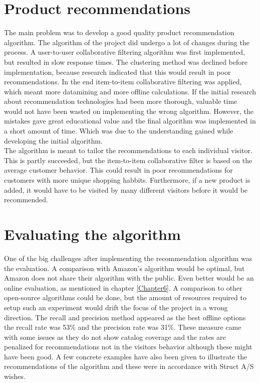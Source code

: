 \section{Product recommendations}
The main problem was to develop a good quality product recommendation algorithm. The algorithm of the project did undergo a lot of changes during the process. A user-to-user collaborative filtering algorithm was first implemented, but resulted in slow response times. The clustering method was declined before implementation, because research indicated that this would result in poor recommendations. \cite{AmazonRecommendations} In the end item-to-item collaborative filtering was applied, which meant more datamining and more offline calculations. If the initial research about recommendation technologies had been more thorough, valuable time would not have been wasted on implementing the wrong algorithm. However, the mistakes gave great educational value and the final algorithm was implemented in a short amount of time. Which was due to the understanding gained while developing the initial algorithm.\\
The algorithm is meant to tailor the recommendations to each individual visitor. This is partly succeeded, but the item-to-item collaborative filter is based on the average customer behavior. This could result in poor recommendations for customers with more unique shopping habbits. Furthermore, if a new product is added, it would have to be visited by many different visitors before it would be recommended.

\section{Evaluating the algorithm}
One of the big challenges after implementing the recommendation algorithm was the evaluation. A comparison with Amazon's algorithm would be optimal, but Amazon does not share their algorithm with the public. Even better would be an online evaluation, as mentioned in chapter \ref{Chapter6}. A comparison to other open-source algorithms could be done, but the amount of resources required to setup such an experiment would drift the focus of the project in a wrong direction. The recall and precision method appeared as the best offline options the recall rate was 53\% and the precision rate was 31\%. These measure came with some issues as they do not show catalog coverage and the rates are penalized for recommendations not in the visitors behavior although these might have been good. A few concrete examples have also been given to illustrate the recommendations of the algorithm and these were in accordance with Struct A/S wishes. 